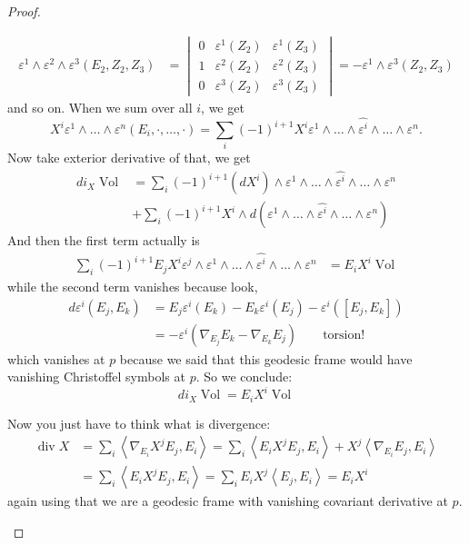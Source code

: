 \begin{proof}
\begin{enumerate}[label=\textbf{Step \arabic*}]
\begin{align*}
	\varepsilon^1\wedge\varepsilon^2\wedge\varepsilon^3(E_2,Z_2,Z_3)&=\begin{vmatrix} 0&\varepsilon^1(Z_2) &\varepsilon^1(Z_3)\\
1&\varepsilon^2(Z_2)&\varepsilon^2(Z_3)\\
0&\varepsilon^3(Z_2)&\varepsilon^3(Z_3)
	\end{vmatrix}=-\varepsilon^1\wedge\varepsilon^3(Z_2,Z_3)
	\end{align*}
and so on. When we sum over all \(i\), we get
\[X^i\varepsilon^1\wedge\ldots\wedge\varepsilon^n(E_i,\cdot,\ldots,\cdot)=\sum_{i}(-1)^{i+1}X^i\varepsilon^1\wedge\ldots\wedge\widehat{\varepsilon^i}\wedge\ldots\wedge\varepsilon^n.\]
Now take exterior derivative of that, we get
\begin{align*}
d i_X\operatorname{Vol}&=\sum_i(-1)^{i+1}(dX^i)\wedge\varepsilon^1\wedge\ldots\wedge\widehat{\varepsilon^i}\wedge\ldots\wedge\varepsilon^n\\
&+\sum_{i}(-1)^{i+1}X^i\wedge d(\varepsilon^1\wedge\ldots\wedge\widehat{\varepsilon^i}\wedge\ldots\wedge\varepsilon^n)\end{align*}
And then the first term actually is
\begin{align*}
\sum_i(-1)^{i+1}E_jX^i\varepsilon^j\wedge\varepsilon^1\wedge\ldots\wedge\widehat{\varepsilon^i}\wedge\ldots\wedge\varepsilon^n&=E_iX^i\operatorname{Vol}
\end{align*}
while the second term vanishes because look,
\begin{align*}d \varepsilon^i(E_j,E_k)&=E_j\varepsilon^i(E_k)-E_k\varepsilon^i(E_j)-\varepsilon^i([E_j,E_k])\\
&=-\varepsilon^i(\nabla_{E_j}E_k-\nabla_{E_k}E_j)\qquad \text{torsion!} \end{align*}
which vanishes at \(p\) because we said that this geodesic frame would have vanishing Christoffel symbols at \(p\). So we conclude:
\[di_X \operatorname{Vol}=E_iX^i\operatorname{Vol}\]

Now you just have to think what is divergence:
\begin{align*}
\operatorname{div}X&=\sum_{i}\left<\nabla_{E_i}X^jE_j,E_i\right>=\sum_{i}\left<E_iX^jE_j,E_i\right>+X^j\left<\nabla_{E_i}E_j,E_i\right>\\
&=\sum_i \left<E_iX^jE_j,E_i\right>=\sum_iE_iX^j\left<E_j,E_i\right>=E_iX^i
\end{align*}
again using that we are a geodesic frame with vanishing covariant derivative at \(p\).


\end{enumerate}
\end{proof}
